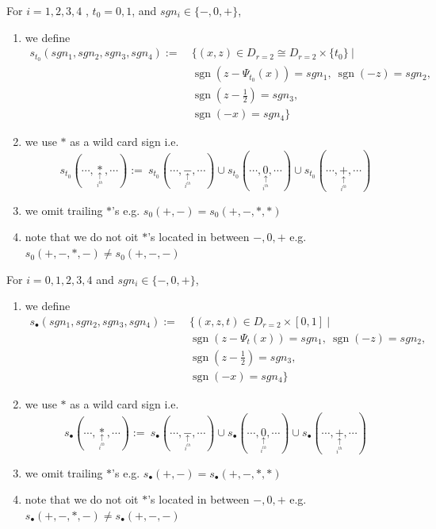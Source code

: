 \begin{definition}
For $i = 1,2,3,4$ , $t_0 = 0,1$, and $sgn_i \in \{-,0,+\}$,
\begin{enumerate}
\item we define
\begin{align*}
s_{t_0}(sgn_1,sgn_2,sgn_3,sgn_4):=~ &\{(x,z) \in D_{r=2}\cong D_{r=2}\times \{t_0\} ~| \\
&\operatorname{sgn}(z-\Psi_{t_0}(x))=sgn_1,~ \operatorname{sgn}(-z)=sgn_2,\\ 
&\operatorname{sgn}(z-\frac{1}{2})=sgn_3,\\
&\operatorname{sgn}(-x)=sgn_4 \}
\end{align*}

\item we use $*$ as a wild card sign i.e. 
\[
s_{t_0}(\cdots,\underset{\underset{i^{th}}{\uparrow}}{*},\cdots):=~ s_{t_0}(\cdots,\underset{\underset{i^{th}}{\uparrow}}{-},\cdots)\cup s_{t_0}(\cdots,\underset{\underset{i^{th}}{\uparrow}}{0},\cdots)\cup s_{t_0}(\cdots,\underset{\underset{i^{th}}{\uparrow}}{+},\cdots)
\]

\item we omit trailing $*$'s e.g. $s_0(+,-) = s_0(+,-,*,*)$

\item note that we do not oit $*$'s located in between $-,0,+$ e.g. $s_0(+,-,*,-) \neq s_0(+,-,-)$

\end{enumerate}
\end{definition}

\begin{definition}
For $i = 0,1,2,3,4$ and $sgn_i \in \{-,0,+\}$,
\begin{enumerate}
\item we define
\begin{align*}
s_{\bullet}(sgn_1,sgn_2,sgn_3,sgn_4):=~ &\{(x,z,t) \in D_{r=2}\times [0,1] ~| \\
&\operatorname{sgn}(z-\Psi_{t}(x))=sgn_1,~ \operatorname{sgn}(-z)=sgn_2,\\ 
&\operatorname{sgn}(z-\frac{1}{2})=sgn_3,\\
&\operatorname{sgn}(-x)=sgn_4 \}
\end{align*}

\item we use $*$ as a wild card sign i.e. 
\[
s_{\bullet}(\cdots,\underset{\underset{i^{th}}{\uparrow}}{*},\cdots):=~ s_{\bullet}(\cdots,\underset{\underset{i^{th}}{\uparrow}}{-},\cdots)\cup s_{\bullet}(\cdots,\underset{\underset{i^{th}}{\uparrow}}{0},\cdots)\cup s_{\bullet}(\cdots,\underset{\underset{i^{th}}{\uparrow}}{+},\cdots)
\]


\item we omit trailing $*$'s e.g. $s_\bullet(+,-) = s_\bullet(+,-,*,*)$

\item note that we do not oit $*$'s located in between $-,0,+$ e.g. $s_\bullet(+,-,*,-) \neq s_\bullet(+,-,-)$
\end{enumerate}
\end{definition}


